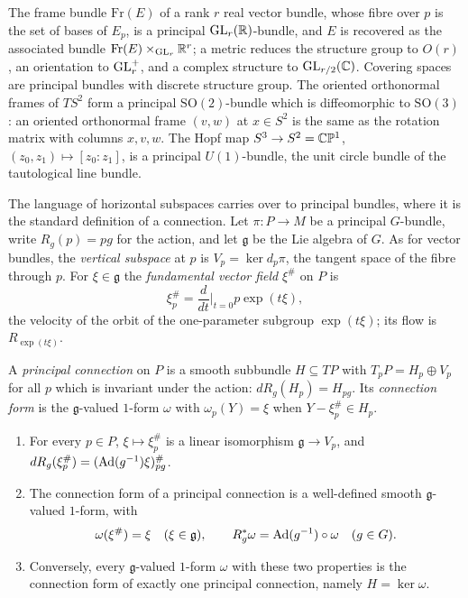 \begin{example}\label{connections:example-principal}
The frame bundle $\mathrm{Fr}(E)$ of a rank $r$ real vector bundle, whose fibre over $p$ is the set of bases of $E_p$, is a principal $\mathrm{GL}_r(\mathbb{R})$-bundle, and $E$ is recovered as the associated bundle
$\mathrm{Fr}(E) \times_{\mathrm{GL}_r}\mathbb{R}^r$; a metric reduces the structure group to $O(r)$, an orientation to $\mathrm{GL}_r^+$, and a complex structure to $\mathrm{GL}_{r/2}(\mathbb{C})$. Covering spaces are principal bundles with
discrete structure group. The oriented orthonormal frames of $TS^2$ form a principal $\mathrm{SO}(2)$-bundle which is diffeomorphic to $\mathrm{SO}(3)$: an oriented orthonormal
frame $(v, w)$ at $x \in S^2$ is the same as the rotation matrix with columns $x, v, w$. The Hopf map $S^3 \to S^2 = \mathbb{C}\mathbb{P}^1$, $(z_0, z_1) \mapsto [z_0 : z_1]$, is a principal
$U(1)$-bundle, the unit circle bundle of the tautological line bundle.
\end{example}


The language of horizontal subspaces carries over to principal bundles, where it is the standard definition of a connection. Let $\pi \colon P \to M$ be a principal $G$-bundle, write
$R_g(p) = pg$ for the action, and let $\mathfrak{g}$ be the Lie algebra of $G$. As for vector bundles, the \emph{vertical subspace} at $p$ is $V_p = \ker d_p\pi$, the tangent space of the fibre
through $p$. For $\xi \in \mathfrak{g}$ the \emph{fundamental vector field} $\xi^\#$ on $P$ is
\[
\xi^\#_p = \frac{d}{dt}\Big|_{t=0}p\exp(t\xi),
\]
the velocity of the orbit of the one-parameter subgroup $\exp(t\xi)$; its flow is $R_{\exp(t\xi)}$.

\begin{definition}\label{connections:definition-principal-connection}
A \emph{principal connection} on $P$ is a smooth subbundle $H \subseteq TP$ with $T_pP = H_p \oplus V_p$ for all $p$ which is invariant under the action: $dR_g(H_p) = H_{pg}$. Its
\emph{connection form} is the $\mathfrak{g}$-valued $1$-form $\omega$ with $\omega_p(Y) = \xi$ when $Y - \xi^\#_p \in H_p$.
\end{definition}

\begin{proposition}\label{connections:proposition-connection-one-form}
\begin{enumerate}
\item For every $p \in P$, $\xi \mapsto \xi^\#_p$ is a linear isomorphism $\mathfrak{g} \to V_p$, and $dR_g(\xi^\#_p) = (\operatorname{Ad}(g^{-1})\xi)^\#_{pg}$.
\item The connection form of a principal connection is a well-defined smooth $\mathfrak{g}$-valued $1$-form, with
\[
\omega(\xi^\#) = \xi \quad (\xi \in \mathfrak{g}), \qquad R_g^*\omega = \operatorname{Ad}(g^{-1}) \circ \omega \quad (g \in G).
\]
\item Conversely, every $\mathfrak{g}$-valued $1$-form $\omega$ with these two properties is the connection form of exactly one principal connection, namely $H = \ker\omega$.
\end{enumerate}
\end{proposition}

